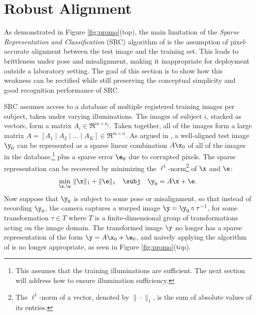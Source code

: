 \section{Robust Alignment}\label{sec:registration} As demonstrated in Figure
\ref{fig:promo}(top), the main limitation of the {\em Sparse Representation and
Classification} (SRC) algorithm of \cite{Wright2009-PAMI} is the assumption of
pixel-accurate alignment between the test image and the training set. This
leads to brittleness under pose and misalignment, making it inappropriate for
deployment outside a laboratory setting. The goal of this section is to show
how this weakness can be rectified while still preserving the conceptual
simplicity and good recognition performance of SRC.

SRC assumes access to a database of multiple registered
training images per subject, taken under varying illuminations.
The images of subject $i$, stacked as vectors, form a matrix
$A_i \in \Re^{m \times n_i}$. Taken together, all of the images
form a large matrix $A = [ A_1 \mid A_2 \mid \dots \mid A_K ]
\in \Re^{m \times n}$. As argued in \cite{Wright2009-PAMI}, a
well-aligned test image $\y_0$ can be represented as a sparse
linear combination $A \x_0$ of all of the images in the
database,\footnote{This assumes that the training illuminations are sufficient. The next section will address how to ensure illumination
sufficiency.} plus a sparse error $\e_0$
due to corrupted pixels. The sparse representation can be recovered by
minimizing the $\ell^1$-norm\footnote{The $\ell^1$-norm of a
vector, denoted by $\|\cdot\|_1$, is the sum of absolute values of its entries.} of
$\x$ and $\e$:
\begin{equation}
\min_{\x,\e} \, \| \x \|_1 + \| \e\|_1 \quad \subj \quad \y_0 = A \x + \e.
\label{eqn:robust-l1}
\end{equation}
Now suppose that $\y_0$ is subject to some pose or
misalignment, so that instead of recording $\y_0$, the camera captures
a warped image $\y = \y_0 \circ \tau^{-1}$, for some
transformation $\tau \in T$ where $T$ is a finite-dimensional
group of transformations acting on the image domain.  The
transformed image $\y$ no longer has a sparse representation of
the form $\y = A \x_0 + \e_0$, and naively applying the
algorithm of \cite{Wright2009-PAMI} is no longer appropriate,
as seen in Figure \ref{fig:promo}(top).

